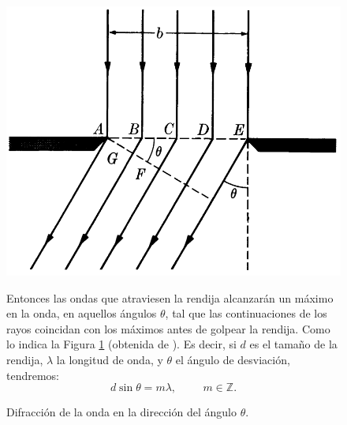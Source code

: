 \documentclass[12pt,a4paper]{article}
\begin{document}
\begin{figure}[hbt!]
	\begin{minipage}{0.4\linewidth}
	\centering
	\includegraphics[width= \linewidth]{1_INTRO/seno.png}
	\caption{Difracción de la onda en la dirección del ángulo \(\theta\).}
	\label{fig:seno}
	\end{minipage}\hspace{5mm}
	\begin{minipage}{0.6\linewidth}
		Entonces las ondas que atraviesen la rendija alcanzarán un máximo en la onda, en aquellos ángulos \(\theta\), tal que las continuaciones de los rayos coincidan con los máximos antes de golpear la rendija. Como lo indica la Figura \ref{fig:seno} (obtenida de ).
		Es decir, si \(d\) es el tamaño de la rendija, \(\lambda\) la longitud de onda, y \(\theta\) el ángulo de desviación, tendremos:
		\begin{equation}
			d \sin \theta = m \lambda , \hspace{1cm} m \in \mathds{Z}.
			\label{eq:posicion_angular}
		\end{equation}
	\end{minipage}
\end{figure}
\end{document}

